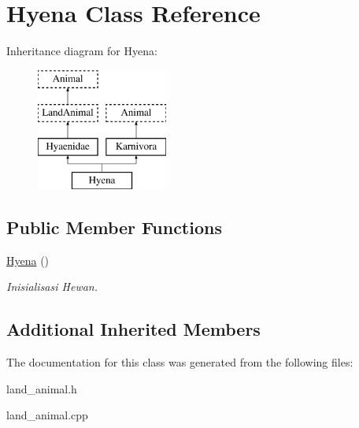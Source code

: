 \hypertarget{class_hyena}{}\section{Hyena Class Reference}
\label{class_hyena}
Inheritance diagram for Hyena\+:\begin{figure}[H]
\begin{center}
\leavevmode
\includegraphics[height=4.000000cm]{class_hyena}
\end{center}
\end{figure}
\subsection*{Public Member Functions}
\begin{DoxyCompactItemize}
\item 
\hyperlink{class_hyena_ad4392117c4580311bae905fd36cee89e}{Hyena} ()\hypertarget{class_hyena_ad4392117c4580311bae905fd36cee89e}{}\label{class_hyena_ad4392117c4580311bae905fd36cee89e}

\begin{DoxyCompactList}\small\item\em Inisialisasi Hewan. \end{DoxyCompactList}\end{DoxyCompactItemize}
\subsection*{Additional Inherited Members}


The documentation for this class was generated from the following files\+:\begin{DoxyCompactItemize}
\item 
land\+\_\+animal.\+h\item 
land\+\_\+animal.\+cpp\end{DoxyCompactItemize}
